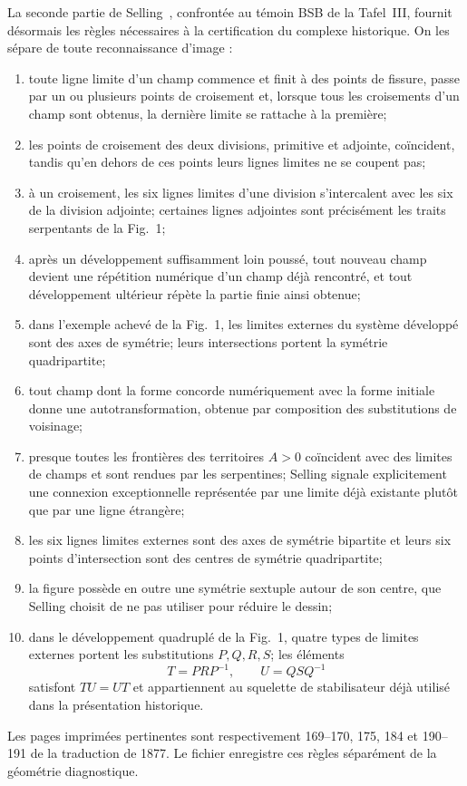 \documentclass[11pt,a4paper]{article}
\begin{document}
La seconde partie de Selling~\cite{Selling1877}, confrontée au témoin BSB de la Tafel~III, fournit désormais les règles nécessaires à la certification du complexe historique. On les sépare de toute reconnaissance d'image :
\begin{enumerate}[label=\textup{(S\arabic*)}]
\item toute ligne limite d'un champ commence et finit à des points de fissure, passe par un ou plusieurs points de croisement et, lorsque tous les croisements d'un champ sont obtenus, la dernière limite se rattache à la première;
\item les points de croisement des deux divisions, primitive et adjointe, coïncident, tandis qu'en dehors de ces points leurs lignes limites ne se coupent pas;
\item à un croisement, les six lignes limites d'une division s'intercalent avec les six de la division adjointe; certaines lignes adjointes sont précisément les traits serpentants de la Fig.~1;
\item après un développement suffisamment loin poussé, tout nouveau champ devient une répétition numérique d'un champ déjà rencontré, et tout développement ultérieur répète la partie finie ainsi obtenue;
\item dans l'exemple achevé de la Fig.~1, les limites externes du système développé sont des axes de symétrie; leurs intersections portent la symétrie quadripartite;
\item tout champ dont la forme concorde numériquement avec la forme initiale donne une autotransformation, obtenue par composition des substitutions de voisinage;
\item presque toutes les frontières des territoires $A>0$ coïncident avec des limites de champs et sont rendues par les serpentines; Selling signale explicitement une connexion exceptionnelle représentée par une limite déjà existante plutôt que par une ligne étrangère;
\item les six lignes limites externes sont des axes de symétrie bipartite et leurs six points d'intersection sont des centres de symétrie quadripartite;
\item la figure possède en outre une symétrie sextuple autour de son centre, que Selling choisit de ne pas utiliser pour réduire le dessin;
\item dans le développement quadruplé de la Fig.~1, quatre types de limites externes portent les substitutions $P,Q,R,S$; les éléments
\[
 T=PRP^{-1},\qquad U=QSQ^{-1}
\]
satisfont $TU=UT$ et appartiennent au squelette de stabilisateur déjà utilisé dans la présentation historique.
\end{enumerate}
Les pages imprimées pertinentes sont respectivement 169--170, 175, 184 et 190--191 de la traduction de 1877. Le fichier  enregistre ces règles séparément de la géométrie diagnostique.
\end{document}
